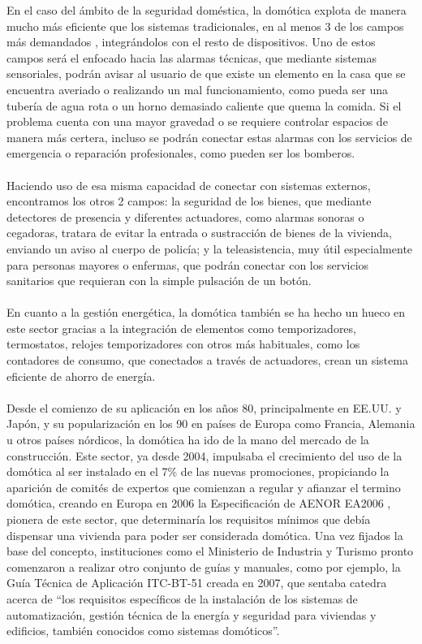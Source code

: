 En el caso del ámbito de la seguridad doméstica, la domótica explota de manera mucho más eficiente que los sistemas tradicionales, en al menos 3 de los campos más demandados \cite{iecor}, integrándolos con el resto de dispositivos. Uno de estos campos será el enfocado hacia las alarmas técnicas, que mediante sistemas sensoriales, podrán avisar al usuario de que existe un elemento en la casa que se encuentra averiado o realizando un mal funcionamiento, como pueda ser una tubería de agua rota o un horno demasiado caliente que quema la comida. Si el problema cuenta con una mayor gravedad o se requiere controlar espacios de manera más certera, incluso se podrán conectar estas alarmas con los servicios de emergencia o reparación profesionales, como pueden ser los bomberos. \\\\
Haciendo uso de esa misma capacidad de conectar con sistemas externos, encontramos los otros 2 campos: la seguridad de los bienes, que mediante detectores de presencia y diferentes actuadores, como alarmas sonoras o cegadoras, tratara de evitar la entrada o sustracción de bienes de la vivienda, enviando un aviso al cuerpo de policía; y la teleasistencia, muy útil especialmente para personas mayores o enfermas, que podrán conectar con los servicios sanitarios que requieran con la simple pulsación de un botón.\\\\
En cuanto a la gestión energética, la domótica también se ha hecho un hueco en este sector gracias a la integración de elementos como temporizadores, termostatos, relojes temporizadores con otros más habituales, como los contadores de consumo, que conectados a través de actuadores, crean un sistema eficiente de ahorro de energía.\\\\
Desde el comienzo de su aplicación en los años 80, principalmente en EE.UU. y Japón, y su popularización en los 90 en países de Europa como Francia, Alemania u otros países nórdicos, la domótica ha ido de la mano del mercado de la construcción. Este sector, ya desde 2004, impulsaba el crecimiento del uso de la domótica al ser instalado en el 7\% \cite{Ikei:2004} de las nuevas promociones, propiciando la aparición de comités de expertos que comienzan a regular y afianzar el termino domótica, creando en Europa en 2006 la Especificación de AENOR EA2006 \cite{direct:2004}, pionera de este sector, que determinaría los requisitos mínimos que debía dispensar una vivienda para poder ser considerada domótica. Una vez fijados la base del concepto, instituciones  como el Ministerio de Industria y Turismo pronto comenzaron a realizar otro conjunto de guías y manuales, como por ejemplo, la Guía Técnica de Aplicación ITC-BT-51 \cite{BOE:2002} creada en 2007, que sentaba catedra acerca de “los requisitos específicos de la instalación de los sistemas de automatización, gestión técnica de la energía y seguridad para viviendas y edificios, también conocidos como sistemas domóticos”.\\\\ 
